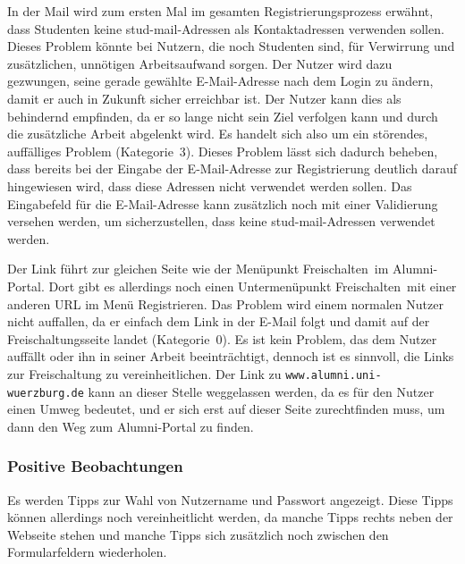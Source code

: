 {
In der Mail wird zum ersten Mal im gesamten Registrierungsprozess erwähnt, dass Studenten keine stud\hbox{-}mail-Adressen als Kontaktadressen verwenden sollen.
}
{
Dieses Problem könnte bei Nutzern, die noch Studenten sind, für Verwirrung und zusätzlichen, unnötigen Arbeitsaufwand sorgen. Der Nutzer wird dazu gezwungen, seine gerade gewählte E\hbox{-}Mail-Adresse nach dem Login zu ändern, damit er auch in Zukunft sicher erreichbar ist. Der Nutzer kann dies als behindernd empfinden, da er so lange nicht sein Ziel verfolgen kann und durch die zusätzliche Arbeit abgelenkt wird. Es handelt sich also um ein störendes, auffälliges Problem (Kategorie~3).
}
{
Dieses Problem lässt sich dadurch beheben, dass bereits bei der Eingabe der E\hbox{-}Mail-Adresse zur Registrierung deutlich darauf hingewiesen wird, dass diese Adressen nicht verwendet werden sollen. Das Eingabefeld für die E\hbox{-}Mail-Adresse kann zusätzlich noch mit einer Validierung versehen werden, um sicherzustellen, dass keine stud\hbox{-}mail-Adressen verwendet werden.
}
\label{prob:frei:studmail}

{
Der Link führt zur gleichen Seite wie der Menüpunkt \glqq Freischalten\grqq ~im Alumni-Portal. Dort gibt es allerdings noch einen Untermenüpunkt \glqq Freischalten\grqq ~mit einer anderen URL im Menü  \glqq Registrieren\grqq.
}
{
Das Problem wird einem normalen Nutzer nicht auffallen, da er einfach dem Link in der E\hbox{-}Mail folgt und damit auf der Freischaltungsseite landet (Kategorie~0).
}
{
Es ist kein Problem, das dem Nutzer auffällt oder ihn in seiner Arbeit beeinträchtigt, dennoch ist es sinnvoll, die Links zur Freischaltung zu vereinheitlichen. Der Link zu \texttt{www.alumni.uni-wuerzburg.de} kann an dieser Stelle weggelassen werden, da es für den Nutzer einen Umweg bedeutet, und er sich erst auf dieser Seite zurechtfinden muss, um dann den Weg zum Alumni-Portal zu finden.
}
\label{prob:frei:link}


\subsubsection*{Positive Beobachtungen}
\label{subsubsec:freischaltung_webseite_positiv}
Es werden Tipps zur Wahl von Nutzername und Passwort angezeigt. Diese Tipps können allerdings noch vereinheitlicht werden, da manche Tipps rechts neben der Webseite stehen und manche Tipps sich zusätzlich noch zwischen den Formularfeldern wiederholen.

